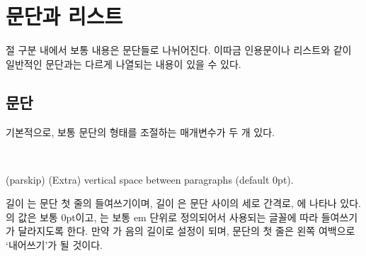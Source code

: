 \chapter{문단과 리스트}


절 구분 내에서 보통 내용은 문단들로 나뉘어진다.
이따금 인용문이나 리스트와 같이 일반적인 문단과는 다르게
나열되는 내용이 있을 수 있다.

\section{문단}


기본적으로, 보통 문단의 형태를 조절하는 매개변수가 두 개 있다.

\begin{syntax}
\lnc{\parindent} \lnc{\parskip} \\
\end{syntax}
\glossary(parskip)%
  {}%
  {(Extra) vertical space between paragraphs (default 0pt).}
 
길이 \lnc{\parindent}는 문단 첫 줄의
들여쓰기이며, 길이 \lnc{\parskip}은 문단 사이의 세로 간격로, 에
나타나 있다.
\lnc{\parskip}의 값은 보통 0pt이고, \lnc{\parindent}는 보통 em 단위로
정의되어서 사용되는 글꼴에 따라 들여쓰기가 달라지도록 한다.
만약 \lnc{\parindent}가 음의 길이로 설정이 되며, 문단의 첫 줄은 왼쪽
여백으로
`내어쓰기'가 될 것이다.

